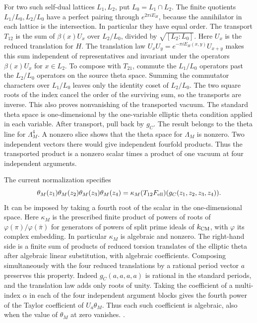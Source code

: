 For two such self-dual lattices \(L_1,L_2\), put \(L_0=L_1\cap L_2\).
The finite quotients \(L_1/L_0,L_2/L_0\) have a perfect pairing
through \(e^{2\pi i E_H}\), because the annihilator in each
lattice is the intersection. In particular they have equal
order. The transport \(T_{12}\) is the sum of
\(\beta(x)U_x\) over \(L_2/L_0\), divided by
\(\sqrt{[L_2:L_0]}\). Here \(U_x\) is the reduced translation
for \(H\). The translation law
\(U_xU_y=e^{-\pi iE_H(x,y)}U_{x+y}\) makes this
sum independent of representatives and invariant under
the operators \(\beta(x)U_x\) for \(x\in L_2\).
To compose with \(T_{21}\), commute the \(L_1/L_0\)
operators past the \(L_2/L_0\) operators on the source
theta space. Summing the commutator characters over
\(L_1/L_0\) leaves only the identity coset of \(L_2/L_0\).
The two square roots of the index cancel the order of the
surviving sum, so the transports are inverse. This also
proves nonvanishing of the transported vacuum. The standard
theta space is one-dimensional by the one-variable elliptic
theta condition applied in each variable. After transport,
pull back by \(g_C\). The result belongs to the theta line
for \(\Lambda_M^4\). A nonzero slice shows that the theta
space for \(\Lambda_M\) is nonzero. Two independent vectors
there would give independent fourfold products. Thus the
transported product is a nonzero scalar times a product of
one vacuum at four independent arguments.

The current normalization specifies
\[
 \theta_M(z_1)\theta_M(z_2)\theta_M(z_3)\theta_M(z_4)
   =\kappa_M (T_{12}F_{\rm ell})(g_C(z_1,z_2,z_3,z_4)).
\]
It can be imposed by taking a fourth root of the scalar in the
one-dimensional space. Here \(\kappa_M\) is the prescribed
finite product of powers of roots of
\(\varphi(\pi)/\varphi(\bar\pi)\) for generators of powers of
split prime ideals of \(k_{\rm CM}\), with \(\varphi\) its
complex embedding. In particular \(\kappa_M\) is algebraic
and nonzero. The right-hand side is a finite sum of products
of reduced torsion translates of the elliptic theta after
algebraic linear substitution, with algebraic coefficients.
Composing simultaneously with the four reduced translations
by a rational period vector \(a\) preserves this property.
Indeed \(g_C(a,a,a,a)\) is rational in the standard periods,
and the translation law adds only roots of unity.
Taking the coefficient of a multi-index \(\alpha\) in each
of the four independent argument blocks gives the fourth
power of the Taylor coefficient of \(U_a\theta_M\).
Thus each such coefficient is algebraic, also when the
value of \(\theta_M\) at zero vanishes.
.

